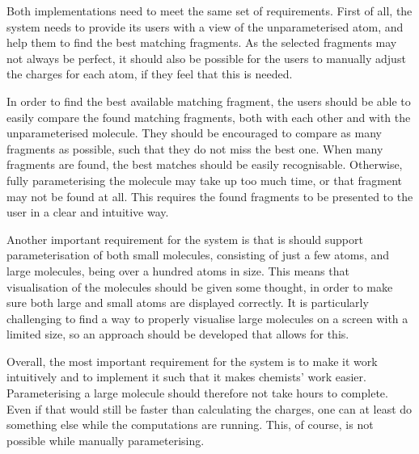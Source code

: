 Both implementations need to meet the same set of requirements. First of all, the system needs to provide its users with a view of the unparameterised atom, and help them to find the best matching fragments. As the selected fragments may not always be perfect, it should also be possible for the users to manually adjust the charges for each atom, if they feel that this is needed.

In order to find the best available matching fragment, the users should be able to easily compare the found matching fragments, both with each other and with the unparameterised molecule. They should be encouraged to compare as many fragments as possible, such that they do not miss the best one. When many fragments are found, the best matches should be easily recognisable. Otherwise, fully parameterising the molecule may take up too much time, or that fragment may not be found at all. This requires the found fragments to be presented to the user in a clear and intuitive way.

Another important requirement for the system is that is should support parameterisation of both small molecules, consisting of just a few atoms, and large molecules, being over a hundred atoms in size. This means that visualisation of the molecules should be given some thought, in order to make sure both large and small atoms are displayed correctly. It is particularly challenging to find a way to properly visualise large molecules on a screen with a limited size, so an approach should be developed that allows for this.

Overall, the most important requirement for the system is to make it work intuitively and to implement it such that it makes chemists' work easier. Parameterising a large molecule should therefore not take hours to complete. Even if that would still be faster than calculating the charges, one can at least do something else while the computations are running. This, of course, is not possible while manually parameterising.
